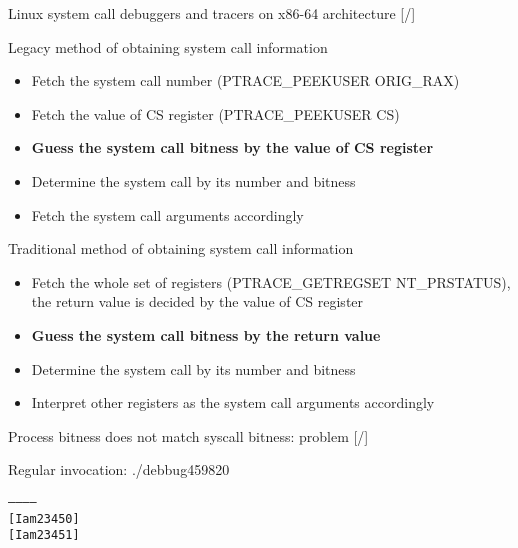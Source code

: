 \documentclass[unicode,aspectratio=169]{beamer}
\begin{document}
\begin{frame}{Linux system call debuggers and tracers on x86-64 architecture \hfill [\insertframenumber/\inserttotalframenumber]}
\large
\begin{block}{Legacy method of obtaining system call information}
\begin{itemize}
	\item Fetch the system call number (PTRACE\_PEEKUSER ORIG\_RAX)
	\item Fetch the value of CS register (PTRACE\_PEEKUSER CS)
	\item {\bf Guess the system call bitness by the value of CS register}
	\item Determine the system call by its number and bitness
	\item Fetch the system call arguments accordingly
\end{itemize}
\end{block}

\begin{block}{Traditional method of obtaining system call information}
\begin{itemize}
	\item Fetch the whole set of registers (PTRACE\_GETREGSET NT\_PRSTATUS), \\
		the return value is decided by the value of CS register
	\item {\bf Guess the system call bitness by the return value}
	\item Determine the system call by its number and bitness
	\item Interpret other registers as the system call arguments accordingly
\end{itemize}
\end{block}
\end{frame}

\begin{frame}[fragile]{Process bitness does not match syscall bitness: problem \hfill [\insertframenumber/\inserttotalframenumber]}
\large
{}

\begin{block}{Regular invocation: ./debbug459820}
\begin{alltt}
------------
[I am 23450]
[I am 23451]
\end{alltt}
\end{block}
\end{frame}
\end{document}
